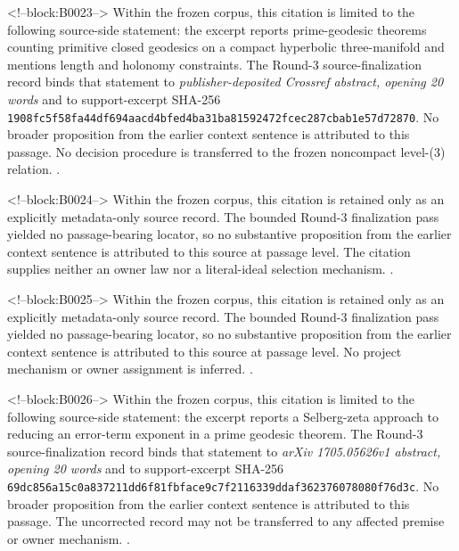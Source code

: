 \documentclass[11pt,a4paper]{article}
\begin{document}
<!--block:B0023-->
Within the frozen corpus, this citation is limited to the following source-side statement: the excerpt reports prime-geodesic theorems counting primitive closed geodesics on a compact hyperbolic three-manifold and mentions length and holonomy constraints. The Round-3 source-finalization record binds that statement to \emph{publisher-deposited Crossref abstract, opening 20 words} and to support-excerpt SHA-256 \texttt{1908fc5f\allowbreak{}58fa44df\allowbreak{}694aacd4\allowbreak{}bfed4ba3\allowbreak{}1ba81592\allowbreak{}472fcec2\allowbreak{}87cbab1e\allowbreak{}57d72870}. No broader proposition from the earlier context sentence is attributed to this passage. No decision procedure is transferred to the frozen noncompact level-(3) relation.
\citep{P29-S08}.

<!--block:B0024-->
Within the frozen corpus, this citation is retained only as an explicitly metadata-only source record. The bounded Round-3 finalization pass yielded no passage-bearing locator, so no substantive proposition from the earlier context sentence is attributed to this source at passage level. The citation supplies neither an owner law nor a literal-ideal selection mechanism.
\citep{P29-S04}.

<!--block:B0025-->
Within the frozen corpus, this citation is retained only as an explicitly metadata-only source record. The bounded Round-3 finalization pass yielded no passage-bearing locator, so no substantive proposition from the earlier context sentence is attributed to this source at passage level. No project mechanism or owner assignment is inferred.
\citep{P29-S05}.

<!--block:B0026-->
Within the frozen corpus, this citation is limited to the following source-side statement: the excerpt reports a Selberg-zeta approach to reducing an error-term exponent in a prime geodesic theorem. The Round-3 source-finalization record binds that statement to \emph{arXiv 1705.05626v1 abstract, opening 20 words} and to support-excerpt SHA-256 \texttt{69dc856a\allowbreak{}15c0a837\allowbreak{}211dd6f8\allowbreak{}1fbface9\allowbreak{}c7f21163\allowbreak{}39ddaf36\allowbreak{}23760780\allowbreak{}80f76d3c}. No broader proposition from the earlier context sentence is attributed to this passage. The uncorrected record may not be transferred to any affected premise or owner mechanism.
\citep{P29-S06}.
\end{document}
